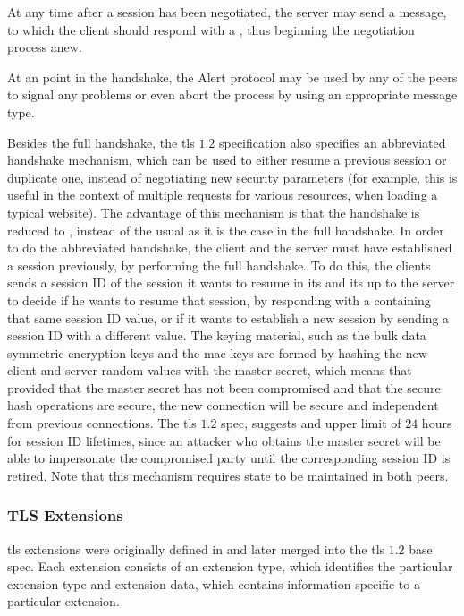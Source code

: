 \documentclass{llncs}
\begin{document}
At any time after a session has been negotiated, the server may send a 
message, to which the client should respond with a , thus
beginning the negotiation process anew.

At an point in the handshake, the Alert protocol may be used by any of the peers
to signal any problems or even abort the process by using an appropriate message type.

Besides the full handshake, the \gls{tls} $1.2$ specification also specifies an
abbreviated handshake mechanism, which can be used to either resume a previous session
or duplicate one, instead of negotiating new security parameters (for example, this is useful
in the context of multiple  requests for various resources, when loading
a typical website). The advantage of this mechanism is that the handshake is reduced
to , instead of the usual  as it is the case in
the full handshake. In order to do the abbreviated handshake,
the client and the server must have established a session previously, by performing
the full handshake. To do this, the clients sends a session ID of the session it wants to
resume in its  and its up to the server to decide if he
wants to resume that session, by responding with a  containing
that same session ID value, or if it wants to establish a new session by
sending a session ID with a different value. The keying material, such as the bulk
data symmetric encryption keys and the \gls{mac} keys are formed by hashing the new client
and server random values with the master secret, which means
that provided that the master secret has not been compromised and that the secure
hash operations are secure, the new connection will be secure and independent
from previous connections. The \gls{tls} $1.2$ spec, suggests and upper limit
of $24$ hours for session ID lifetimes, since an attacker who obtains the master secret
will be able to impersonate the compromised party until the corresponding session
ID is retired. Note that this mechanism requires state to be maintained in both peers.

\subsubsection{TLS Extensions}

\gls{tls} extensions were originally defined in \cite{RFC4366}
and later merged into the \gls{tls} $1.2$ base spec. Each extension consists of an
extension type, which identifies the particular extension type and extension data,
which contains information specific to a particular extension.
\end{document}
